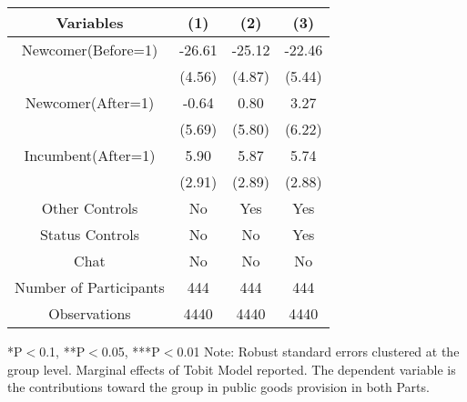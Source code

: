 \begin{table}[htbp]
    \begin{tabular}{c c c c}
    \toprule
    \textbf{Variables} & \textbf{(1)} & \textbf{(2)} & \textbf{(3)}       \\ 
\midrule
Newcomer(Before=1)               &     -26.61\sym{***}    &    -25.12\sym{***}  &  -22.46\sym{***}   \\
                                 &     (4.56)             &     (4.87)          &  (5.44)         \\
\addlinespace
Newcomer(After=1)                &     -0.64           &     0.80         &  3.27          \\
                                 &     (5.69)          &     (5.80)        &  (6.22)         \\
\addlinespace
Incumbent(After=1)               &     5.90\sym{**}    &     5.87\sym{**}  &  5.74\sym{**}     \\
                                 &     (2.91)          &     (2.89)        &  (2.88)         \\
\midrule
Other Controls                   &    No               &    Yes              &    Yes             \\
Status Controls                    &    No               &    No               &    Yes             \\
Chat                             &    No               &    No               &    No               \\
\midrule
Number of Participants           &    444               &    444              &    444               \\
\midrule
Observations                     &       4440          &       4440          &  4440          \\
\bottomrule

\end{tabular}
\begin{footnotesize}
\newline
*P$<$0.1, **P$<$0.05, ***P$<$0.01
\newline
Note: Robust standard errors clustered at the group level. Marginal effects of Tobit Model reported. 
\newline
The dependent variable is the contributions toward the group in public goods provision in both Parts.\end{footnotesize}
\end{table}